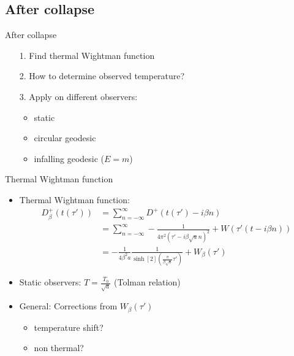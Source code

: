 \documentclass{beamer}
\begin{document}
\subsection{After collapse}
\begin{frame}{After collapse}
\begin{itemize}
	\item[1.] Find thermal Wightman function
	\item[]
	\item[2.] How to determine observed temperature?
	\item[]
	\item[3.] Apply on different observers:
	\begin{itemize}
		\item static
		\item circular geodesic
		\item infalling geodesic (\(E = m\))
	\end{itemize}
\end{itemize}
\end{frame}


\begin{frame}{Thermal Wightman function}

\begin{itemize}
	\item Thermal Wightman function:
	\begin{align*}
		D_\beta^+(t(\tau')) &= \sum_{n=-\infty}^\infty D^+(t(\tau') - i \beta n)\\
			&= \sum_{n=-\infty}^\infty -\frac{1}{4\pi^2 (\tau' - i\beta \sqrt{a} n)^2} + W(\tau'(t - i\beta n))\\
			&= -\frac{1}{4\beta^2 a} \frac{1}{\sinh[2](\frac{\pi}{\beta \sqrt{a}} \tau')} + W_\beta(\tau')
	\end{align*}
	\item Static observers: \(T = \frac{T_0}{\sqrt{a}}\) (Tolman relation)
	\item General: Corrections from \(W_\beta(\tau')\)
	\begin{itemize}
		\item temperature shift?
		\item non thermal?
	\end{itemize}
\end{itemize}
\end{frame}
\end{document}
